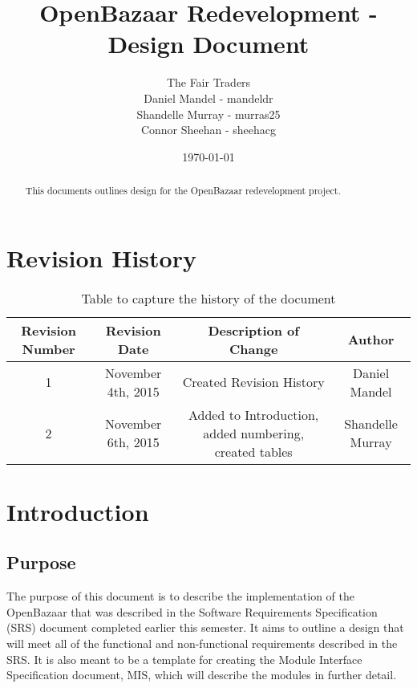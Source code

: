 \documentclass{article}
\begin{document}
\title{OpenBazaar Redevelopment - Design Document}
\author{The Fair Traders \\ Daniel Mandel - mandeldr \\ Shandelle Murray - murras25 \\ Connor Sheehan - sheehacg}
\date{\today}
\maketitle

\begin{abstract}
This documents outlines design for the OpenBazaar redevelopment project.
\end{abstract}

\newpage

\tableofcontents


\newpage
\section*{Revision History}

\begin{table}[h!]
\centering
\begin{tabular}{||c c c c||}
 \hline
 Revision Number & Revision Date & Description of Change & Author \\ [0.5ex]
 \hline\hline
 1 & November 4th, 2015 & Created Revision History & Daniel Mandel \\ [1ex]
 \hline
 2 & November 6th, 2015 & Added to Introduction, added numbering, created tables & Shandelle Murray \\ [1ex]
 \hline
\end{tabular}
\caption{Table to capture the history of the document}
\label{table:1}
\end{table}

\newpage

\section*{Introduction}
\subsection{Purpose}
The purpose of this document is to describe the implementation of the OpenBazaar that was described in the Software Requirements Specification (SRS) document completed earlier this semester. It aims to outline a design that will meet all of the functional and non-functional requirements described in the SRS. It is also meant to be a template for creating the Module Interface Specification document, MIS, which will describe the modules in further detail. 
\end{document}
